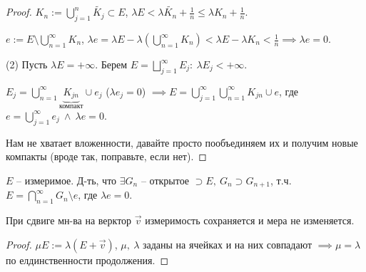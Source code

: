 \begin{consequence}
\begin{enumerate}
{\begin{proof}
                $K_n := \bigcup_{j=1}^{n} \tilde{K_j} \subset E$, $\lambda E < \lambda \tilde{K_n} + \frac{1}{n} \leq \lambda K_n + \frac{1}{n}$.

                $e := E \setminus \bigcup_{n=1}^{\infty} K_n$, $\lambda e = \lambda E - \lambda \left( \bigcup_{n=1}^{\infty} K_n \right) < \lambda E - \lambda K_n < \frac{1}{n} \implies \lambda e = 0$.

                (2) Пусть $\lambda E = +\infty$. Берем $E = \bigsqcup_{j=1}^{\infty} E_j: \ \lambda E_j < +\infty$.

                $E_j = \bigcup_{n=1}^{\infty} \underbrace{K_{jn}}_{\text{компакт}} \cup e_j$ ($\lambda e_j = 0$) $\implies E = \bigcup_{j=1}^{\infty} \bigcup_{n=1}^{\infty} K_{jn} \cup e$, где $e = \bigcup_{j=1}^{\infty} e_j \ \land \ \lambda e = 0$.

                Нам не хватает вложенности, давайте просто пообъединяем их и получим новые компакты (вроде так, поправьте, если нет).
            \end{proof}
        }
    \end{enumerate}
\end{consequence}

\begin{exerc}
    $E$ -- измеримое. Д-ть, что $\exists G_n$ -- открытое $\supset E, \ G_n \supset G_{n+1}$, т.ч. $E = \bigcap_{n=1}^{\infty} G_n \setminus e$, где $\lambda e = 0$. 
\end{exerc}

\begin{theorem}
    При сдвиге мн-ва на верктор $\vec{v}$ измеримость сохраняется и мера не изменяется.
\end{theorem}
\begin{proof}
    $\mu E := \lambda (E + \vec{v})$, $\mu, \ \lambda$ заданы на ячейках и на них совпадают $\implies \mu = \lambda$ по елдинственности продолжения.
\end{proof}

